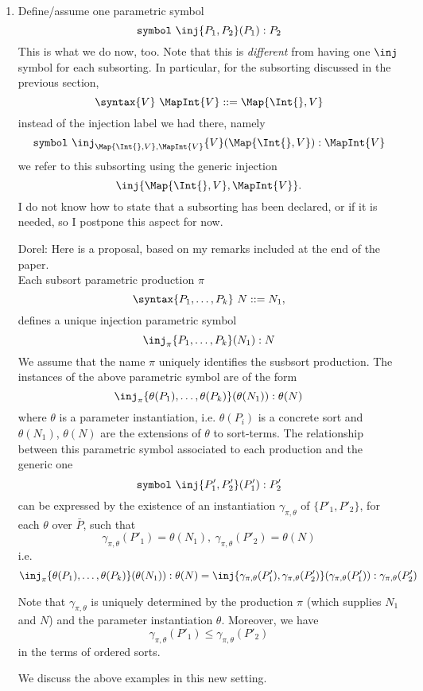 \documentclass{article}
\newcommand\comment[2]{\par\noindent\color{red}#1: #2\color{black}\par\noindent}
\newcommand\dl{\comment{Dorel}}
\theoremstyle{definition}
\theoremstyle{definition}
\theoremstyle{definition}
\theoremstyle{definition}
\theoremstyle{theorem}
\theoremstyle{theorem}
\theoremstyle{theorem}
\theoremstyle{theorem}
\theoremstyle{theorem}
\newcommand{\KWsymbol}{\texttt{symbol}}
\begin{document}
\begin{enumerate}[label=(\arabic*)]
\item\label{assume-inj}
Define/assume one parametric symbol
\[\KWsymbol\ \inj\{P_1,P_2\}(P_1):P_2\]
This is what we do now, too.
Note that this is \emph{different} from having one \(\inj\)
symbol for each subsorting.
In particular, for the subsorting discussed in the previous section,
\[\syntax\{V\}\ \MapInt{V}::=\Map{\Int\{\},V}\]
instead of the injection label we had there, namely
\[\KWsymbol\ \inj_{\Map{\Int\{\},V},\MapInt{V}}\{V\}(\Map{\Int\{\},V}):\MapInt{V}\]
we refer to this subsorting using the generic injection
\[\inj\{\Map{\Int\{\},V},\MapInt{V}\}.\]
I do not know how to state that a subsorting has been declared,
or if it is needed, so I postpone this aspect for now.
\dl{
Here is a proposal, based on my remarks included at the end of the paper.
\\
Each subsort parametric production $\pi$
\[\syntax\{P_1,\ldots,P_k\}\ N::=N_1,\]
defines a unique injection parametric symbol
\[\inj_\pi\{P_1,\ldots,P_k\}(N_1):N\]
We assume that the name $\pi$ uniquely identifies the susbsort production. 
The instances of the above parametric symbol are of the form
\[\inj_\pi\{\theta(P_1),\ldots,\theta(P_k)\}(\theta(N_1)):\theta(N)\]
where $\theta$ is a parameter instantiation, i.e. $\theta(P_i)$ is a concrete sort
and $\theta(N_1)$, $\theta(N)$ are the extensions of $\theta$ to sort-terms. 
The relationship between this parametric symbol associated to each production and 
the generic one
\[\KWsymbol\ \inj\{P'_1,P'_2\}(P'_1):P'_2\]
can be expressed by the existence of an instantiation $\gamma_{\pi,\theta}$ of $\{P'_1,P'_2\}$, 
for each $\theta$  over $\bar{P}$, such that
\[\gamma_{\pi,\theta}(P'_1)=\theta(N_1),\ \gamma_{\pi,\theta}(P'_2)=\theta(N)\]
i.e.
\[\inj_\pi\{\theta(P_1),\ldots,\theta(P_k)\}(\theta(N_1)):\theta(N) = \inj\{\gamma_{\pi,\theta}(P'_1),\gamma_{\pi,\theta}(P'_2)\}(\gamma_{\pi,\theta}(P'_1)):\gamma_{\pi,\theta}(P'_2)\]

Note that $\gamma_{\pi,\theta}$ is uniquely determined by the production $\pi$ (which supplies $N_1$ and $N$) and the parameter instantiation $\theta$. Moreover, we have
\[\gamma_{\pi,\theta}(P'_1)\le \gamma_{\pi,\theta}(P'_2)\]
in the terms of ordered sorts.

We discuss the above examples in this new setting.

}
\end{enumerate}
\end{document}
